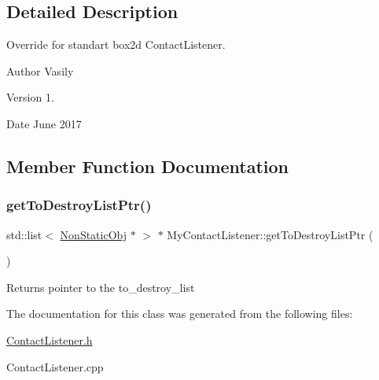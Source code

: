 \subsection{Detailed Description}
Override for standart box2d Contact\+Listener. 

\begin{DoxyAuthor}{Author}
Vasily 
\end{DoxyAuthor}
\begin{DoxyVersion}{Version}
1. 
\end{DoxyVersion}
\begin{DoxyDate}{Date}
June 2017 
\end{DoxyDate}


\subsection{Member Function Documentation}
\mbox{\label{class_my_contact_listener_a3e414c674f98a2f35e2c894923d045b2}} 
\subsubsection{\texorpdfstring{get\+To\+Destroy\+List\+Ptr()}{getToDestroyListPtr()}}
{\footnotesize\ttfamily std\+::list$<$ \hyperlink{class_non_static_obj}{Non\+Static\+Obj} $\ast$ $>$ $\ast$ My\+Contact\+Listener\+::get\+To\+Destroy\+List\+Ptr (\begin{DoxyParamCaption}{ }\end{DoxyParamCaption})}

\begin{DoxyReturn}{Returns}
pointer to the \textquotesingle{}to\+\_\+destroy\+\_\+list\textquotesingle{} 
\end{DoxyReturn}


The documentation for this class was generated from the following files\+:\begin{DoxyCompactItemize}
\item 
\hyperlink{_contact_listener_8h}{Contact\+Listener.\+h}\item 
Contact\+Listener.\+cpp\end{DoxyCompactItemize}
